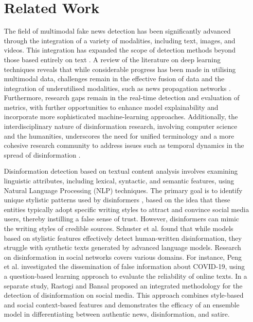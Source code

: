 \section{Related Work}
\label{sec:related_work}

The field of multimodal fake news detection has been significantly advanced through the integration of a variety of modalities, including text, images, and videos. This integration has expanded the scope of detection methods beyond those based entirely on text \cite{Comito2023}. A review of the literature on deep learning techniques reveals that while considerable progress has been made in utilising multimodal data, challenges remain in the effective fusion of data and the integration of underutilised modalities, such as news propagation networks \cite{Tufchi2023}. Furthermore, research gaps remain in the real-time detection and evaluation of metrics, with further opportunities to enhance model explainability and incorporate more sophisticated machine-learning approaches. Additionally, the interdisciplinary nature of disinformation research, involving computer science and the humanities, underscores the need for unified terminology and a more cohesive research community to address issues such as temporal dynamics in the spread of disinformation \cite{Wilson2023}.

Disinformation detection based on textual content analysis involves examining linguistic attributes, including lexical, syntactic, and semantic features, using Natural Language Processing (NLP) techniques. The primary goal is to identify unique stylistic patterns used by disinformers \cite{MontoroMontarroso2023}, based on the idea that these entities typically adopt specific writing styles to attract and convince social media users, thereby instilling a false sense of trust. However, disinformers can mimic the writing styles of credible sources. Schuster et al. \cite{Schuster2020} found that while models based on stylistic features effectively detect human-written disinformation, they struggle with synthetic texts generated by advanced language models. Research on disinformation in social networks covers various domains. For instance, Peng et al. \cite{PENG2023120501} investigated the dissemination of false information about COVID-19, using a question-based learning approach to evaluate the reliability of online texts. In a separate study, Rastogi and Bansal \cite{Rastogi2022} proposed an integrated methodology for the detection of disinformation on social media. This approach combines style-based and social context-based features and demonstrates the efficacy of an ensemble model in differentiating between authentic news, disinformation, and satire.

